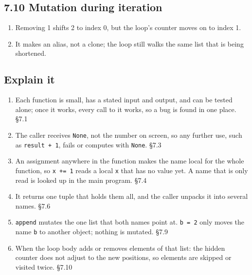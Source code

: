 \documentclass[11pt]{article}
\begin{document}
\begin{keepsection}\subsection{7.10 Mutation during iteration}

\begin{enumerate}
\item Removing 1 shifts 2 to index 0, but the loop’s counter moves on to index 1.
\item It makes an alias, not a clone; the loop still walks the same list that is being shortened.
\end{enumerate}

\end{keepsection}
\begin{keepsection}\subsection{Explain it}

\begin{enumerate}
\item Each function is small, has a stated input and output, and can be tested alone; once it works, every call to it works, so a bug is found in one place. \hfill{\small\color{FAUblue}§7.1}
\item The caller receives \texttt{None}, not the number on screen, so any further use, such as \texttt{result + 1}, fails or computes with \texttt{None}. \hfill{\small\color{FAUblue}§7.3}
\item An assignment anywhere in the function makes the name local for the whole function, so \texttt{x += 1} reads a local \texttt{x} that has no value yet. A name that is only read is looked up in the main program. \hfill{\small\color{FAUblue}§7.4}
\item It returns one tuple that holds them all, and the caller unpacks it into several names. \hfill{\small\color{FAUblue}§7.6}
\item \texttt{append} mutates the one list that both names point at. \texttt{b = 2} only moves the name \texttt{b} to another object; nothing is mutated. \hfill{\small\color{FAUblue}§7.9}
\item When the loop body adds or removes elements of that list: the hidden counter does not adjust to the new positions, so elements are skipped or visited twice. \hfill{\small\color{FAUblue}§7.10}
\end{enumerate}

\end{keepsection}
\end{document}
